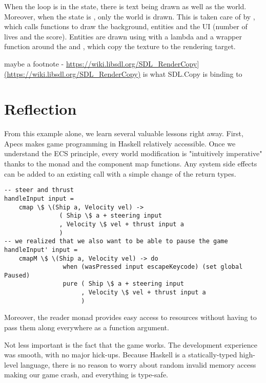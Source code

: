 \documentclass[
  digital, %
  color,   %
  table,   %
  oneside, %
  lof,     %
  lot,     %
]{fithesis3}
\begin{document}
When the loop is in the  state, there is text being drawn
as well as the world. Moreover, when the state is ,
only the world is drawn. This is taken care of by ,
which calls functions to draw the background, entities and the UI
(number of lives and the score). Entities are drawn using 
with a lambda and a wrapper function around the  and
, which copy the texture to the rendering target.

maybe a footnote - \url{https://wiki.libsdl.org/SDL_RenderCopy](https://wiki.libsdl.org/SDL_RenderCopy)}
is what SDL.Copy is binding to



\section{Reflection}
From this example alone, we learn several valuable lessons right away.
First, Apecs makes game programming in Haskell relatively accessible.
Once we understand the ECS principle, every world modification is
"intuitively imperative" thanks to the  monad and
the component map functions. Any system side effects can be added
to an existing  call with a simple change of the return types.
\begin{verbatim}
-- steer and thrust
handleInput input =
    cmap \$ \(Ship a, Velocity vel) ->
               ( Ship \$ a + steering input
               , Velocity \$ vel + thrust input a
               )
-- we realized that we also want to be able to pause the game
handleInput' input =
    cmapM \$ \(Ship a, Velocity vel) -> do
                when (wasPressed input escapeKeycode) (set global Paused)
                pure ( Ship \$ a + steering input
                     , Velocity \$ vel + thrust input a
                     )
\end{verbatim}

Moreover, the  reader monad provides easy
access to resources without having to pass them along everywhere as a function argument.

Not less important is the fact that the game works.
The development experience was smooth, with no major hick-ups.
Because Haskell is a statically-typed high-level language, there is
no reason to worry about random invalid memory access making our game crash,
and everything is type-safe.
\end{document}
